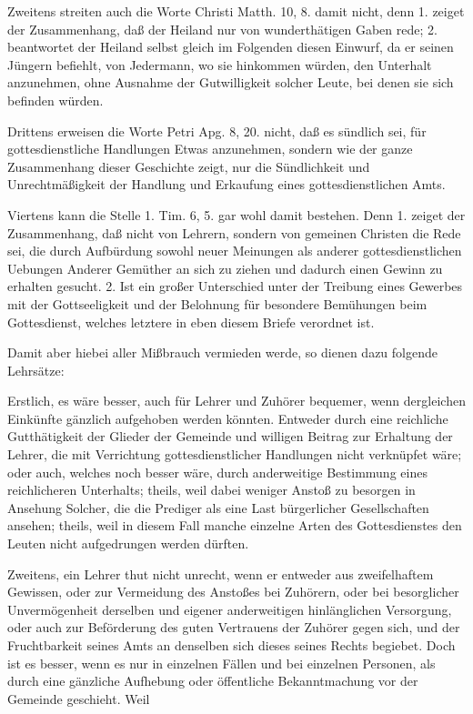 Zweitens streiten auch die Worte Christi Matth. 10, 8. damit nicht, denn 1. zeiget der Zusammenhang, daß der Heiland nur von wunderthätigen Gaben rede; 2. beantwortet der
Heiland selbst gleich im Folgenden diesen Einwurf, da er seinen Jüngern befiehlt, von Jedermann, wo sie hinkommen würden, den Unterhalt anzunehmen, ohne Ausnahme der Gutwilligkeit solcher Leute, bei denen sie sich befinden würden.

Drittens erweisen die Worte Petri Apg. 8, 20. nicht, daß es sündlich sei, für gottesdienstliche Handlungen Etwas anzunehmen, sondern wie der ganze Zusammenhang dieser Geschichte zeigt, nur die Sündlichkeit und Unrechtmäßigkeit der Handlung und Erkaufung eines gottesdienstlichen Amts.

Viertens kann die Stelle 1. Tim. 6, 5. gar wohl damit bestehen. Denn 1. zeiget der Zusammenhang, daß nicht von Lehrern, sondern von gemeinen Christen die Rede sei, die durch Aufbürdung sowohl neuer Meinungen als anderer gottesdienstlichen Uebungen Anderer Gemüther an sich zu ziehen und dadurch einen Gewinn zu erhalten gesucht. 2. Ist ein großer Unterschied unter der Treibung eines Gewerbes mit der Gottseeligkeit und der Belohnung für besondere Bemühungen beim Gottesdienst, welches letztere in eben diesem Briefe verordnet ist.

Damit aber hiebei aller Mißbrauch vermieden werde, so dienen dazu folgende Lehrsätze:

Erstlich, es wäre besser, auch für Lehrer und Zuhörer bequemer, wenn dergleichen Einkünfte gänzlich aufgehoben werden könnten. Entweder durch eine reichliche Gutthätigkeit der Glieder der Gemeinde und willigen Beitrag zur Erhaltung der Lehrer, die mit Verrichtung gottesdienstlicher Handlungen nicht verknüpfet wäre; oder auch, welches noch besser wäre, durch anderweitige Bestimmung eines reichlicheren Unterhalts; theils, weil dabei weniger Anstoß zu besorgen in Ansehung Solcher, die die Prediger als eine Last bürgerlicher Gesellschaften ansehen; theils, weil in diesem Fall manche einzelne Arten des Gottesdienstes den Leuten nicht aufgedrungen werden dürften.

Zweitens, ein Lehrer thut nicht unrecht, wenn
er entweder aus zweifelhaftem Gewissen, oder zur Vermeidung des Anstoßes bei Zuhörern, oder bei besorglicher Unvermögenheit derselben und eigener anderweitigen hinlänglichen Versorgung, oder auch zur Beförderung des guten Vertrauens der Zuhörer gegen sich, und der Fruchtbarkeit seines Amts an denselben sich dieses seines Rechts begiebet. Doch ist es besser, wenn es nur in einzelnen Fällen und bei einzelnen Personen, als durch eine gänzliche Aufhebung oder öffentliche Bekanntmachung vor der Gemeinde geschieht. Weil

